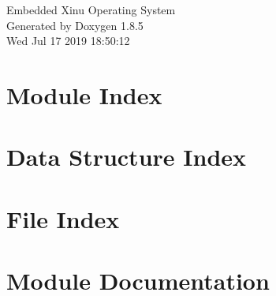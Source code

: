 \documentclass[twoside]{book}
\newcommand{\clearemptydoublepage}{%
  \newpage{\pagestyle{empty}\cleardoublepage}%
}
\begin{document}
\hypersetup{pageanchor=false}
\begin{titlepage}
\vspace*{7cm}
\begin{center}%
{\Large Embedded Xinu Operating System }\\
\vspace*{1cm}
{\large Generated by Doxygen 1.8.5}\\
\vspace*{0.5cm}
{\small Wed Jul 17 2019 18:50:12}\\
\end{center}
\end{titlepage}
\clearemptydoublepage
\tableofcontents
\clearemptydoublepage
{}
\hypersetup{pageanchor=true}

\chapter{Module Index}

\chapter{Data Structure Index}

\chapter{File Index}

\chapter{Module Documentation}






































\end{document}
